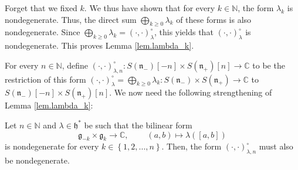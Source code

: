 \documentclass[etingof-lie.tex]{subfiles}
\begin{document}
Forget that we fixed $k$. We thus have shown that for every $k\in\mathbb{N}$,
the form $\lambda_{k}$ is nondegenerate. Thus, the direct sum $\bigoplus
\limits_{k\geq0}\lambda_{k}$ of these forms is also nondegenerate. Since
$\bigoplus\limits_{k\geq0}\lambda_{k}=\left(  \cdot,\cdot\right)  _{\lambda
}^{\circ}$, this yields that $\left(  \cdot,\cdot\right)  _{\lambda}^{\circ}$
is nondegenerate. This proves Lemma \ref{lem.lambda_k}.

For every $n\in\mathbb{N}$, define $\left(  \cdot,\cdot\right)  _{\lambda
,n}^{\circ}:S\left(  \mathfrak{n}_{-}\right)  \left[  -n\right]  \times
S\left(  \mathfrak{n}_{+}\right)  \left[  n\right]  \rightarrow\mathbb{C}$ to
be the restriction of this form $\left(  \cdot,\cdot\right)  _{\lambda}%
^{\circ}=\bigoplus\limits_{k\geq0}\lambda_{k}:S\left(  \mathfrak{n}%
_{-}\right)  \times S\left(  \mathfrak{n}_{+}\right)  \rightarrow\mathbb{C}$
to $S\left(  \mathfrak{n}_{-}\right)  \left[  -n\right]  \times S\left(
\mathfrak{n}_{+}\right)  \left[  n\right]  $. We now need the following
strengthening of Lemma \ref{lem.lambda_k}:

\begin{lemma}
\label{lem.lambda_k.2}Let $n\in\mathbb{N}$ and $\lambda\in\mathfrak{h}^{\ast}$
be such that the bilinear form%
\[
\mathfrak{g}_{-k}\times\mathfrak{g}_{k}\rightarrow\mathbb{C}%
,\ \ \ \ \ \ \ \ \ \ \left(  a,b\right)  \mapsto\lambda\left(  \left[
a,b\right]  \right)
\]
is nondegenerate for every $k\in\left\{  1,2,...,n\right\}  $. Then, the form
$\left(  \cdot,\cdot\right)  _{\lambda,n}^{\circ}$ must also be nondegenerate.
\end{lemma}
\end{document}
